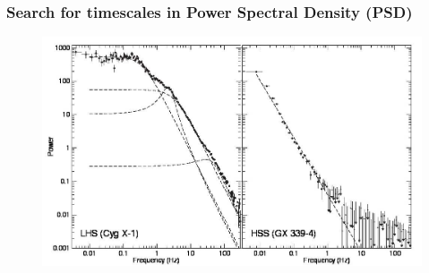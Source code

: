\documentclass[hyperref={pdfpagelabels=false}]{beamer}
\begin{document}
\begin{frame}
\frametitle{Search for timescales in Power Spectral Density (PSD)}
  \begin{center}
    \centering
        \begin{figure}
          \includegraphics[scale=0.75]{images/BelloniStella14_PDS.jpg}
        \end{figure}
  \end{center}
  \begin{center}
    \centering
    {\tiny \citet{BelloniAccretion}}
  \end{center}
\end{frame}
\end{document}

